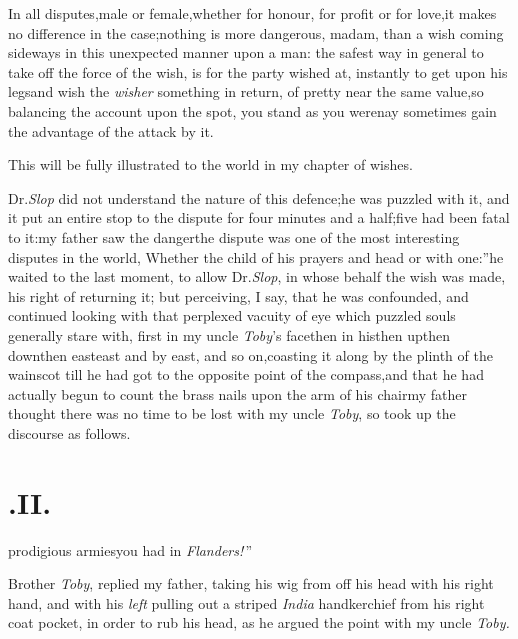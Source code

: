 \documentclass{article}
\begin{document}
In all disputes,\tsh male or female,\tsh whether for honour, for
profit or for love,\break \tsk it makes no difference in the
case;\tsk nothing is more dangerous, madam, than a wish coming
sideways in this unexpect\-ed manner upon a man: the safest way
in general to take off the force of the wish, is for the party
wished at, instantly to get upon his legs\tsk and wish the
\textit{wisher} something in return, of pretty near the same
value,\tsk so balancing the account upon the spot, you stand as
you were\tsk nay sometimes gain the advantage of the attack by
it.

This will be fully illustrated to the\break
world in my chapter of wishes.\tsh

Dr.\@ \textit{Slop} did not understand the nature of this
defence;\tsk he was puzzled with it, and it put an entire stop
to the dispute for four minutes and a half;\tsk five had been
fatal to it:\tsk my father saw the danger\tsk the dispute was
one of the most interesting disputes in the world,\break
\lqq Whether the child of his prayers and  head or with one:”\tsk he waited to
the last moment, to allow Dr.\@ \textit{Slop}, in whose behalf
the wish was made, his right of returning it; but perceiving, I
say, that he was confounded, and continued looking with that
perplexed vacuity of eye which puzzled souls generally stare
with,\break
\tsh first in my uncle \textit{Toby}’s face\tsk then
in his\tsk then up\tsk then down\tsk then 
east\tsk east and by east, and so on,\tsh coasting it along by the plinth of the
wainscot till he had got to the opposite point of the
compass,\tsh and that he had actually begun to count the brass
nails upon the arm of his chair\tsk my father thought there was
no time to be lost with my uncle \textit{Toby}, so took up the
discourse as follows.

\section{.\quad  II.}

prodigious armies\break you had in \textit{Flanders!}\,”\tsh

Brother \textit{Toby}, replied my father, taking his wig from
off his head with his right hand, and with his \textit{left}
pulling out a striped \textit{India} handkerchief from his right
coat pocket, in order to rub his head, as he argued the point
with my uncle \textit{Toby.}\tsh
\end{document}
